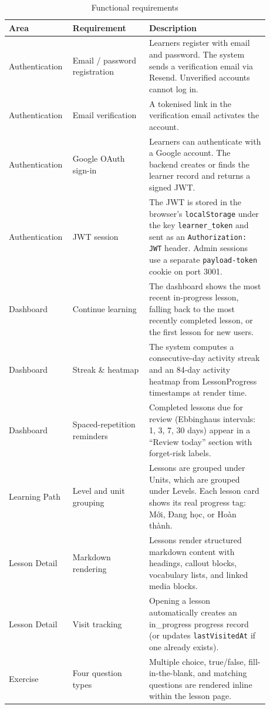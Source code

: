 \begin{longtable}{p{0.16\linewidth} p{0.28\linewidth} p{0.44\linewidth}}
\caption{Functional requirements}\\
\toprule
Area & Requirement & Description \\
\midrule
\endhead
Authentication & Email / password registration & Learners register with email and password. The system sends a verification email via Resend. Unverified accounts cannot log in. \\
Authentication & Email verification & A tokenised link in the verification email activates the account. \\
Authentication & Google OAuth sign-in & Learners can authenticate with a Google account. The backend creates or finds the learner record and returns a signed JWT. \\
Authentication & JWT session & The JWT is stored in the browser's \texttt{localStorage} under the key \texttt{learner\_token} and sent as an \texttt{Authorization: JWT} header. Admin sessions use a separate \texttt{payload-token} cookie on port 3001. \\
Dashboard & Continue learning & The dashboard shows the most recent in-progress lesson, falling back to the most recently completed lesson, or the first lesson for new users. \\
Dashboard & Streak \& heatmap & The system computes a consecutive-day activity streak and an 84-day activity heatmap from LessonProgress timestamps at render time. \\
Dashboard & Spaced-repetition reminders & Completed lessons due for review (Ebbinghaus intervals: 1, 3, 7, 30 days) appear in a ``Review today'' section with forget-risk labels. \\
Learning Path & Level and unit grouping & Lessons are grouped under Units, which are grouped under Levels. Each lesson card shows its real progress tag: Mới, Đang học, or Hoàn thành. \\
Lesson Detail & Markdown rendering & Lessons render structured markdown content with headings, callout blocks, vocabulary lists, and linked media blocks. \\
Lesson Detail & Visit tracking & Opening a lesson automatically creates an in\_progress progress record (or updates \texttt{lastVisitedAt} if one already exists). \\
Exercise & Four question types & Multiple choice, true/false, fill-in-the-blank, and matching questions are rendered inline within the lesson page. \\

\end{longtable}
